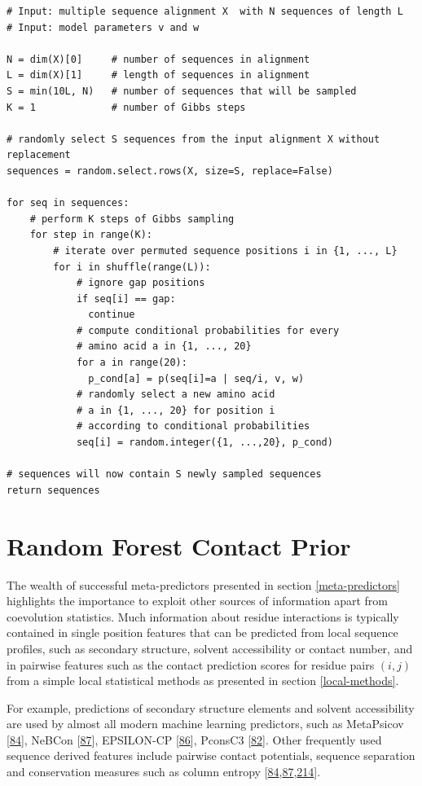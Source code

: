 \documentclass[11pt,a4paper,twoside]{book}
\theoremstyle{definition}
\theoremstyle{definition}
\theoremstyle{remark}
\begin{document}
\begin{verbatim}
# Input: multiple sequence alignment X  with N sequences of length L
# Input: model parameters v and w

N = dim(X)[0]     # number of sequences in alignment
L = dim(X)[1]     # length of sequences in alignment
S = min(10L, N)   # number of sequences that will be sampled
K = 1             # number of Gibbs steps

# randomly select S sequences from the input alignment X without replacement
sequences = random.select.rows(X, size=S, replace=False)

for seq in sequences:
    # perform K steps of Gibbs sampling
    for step in range(K):
        # iterate over permuted sequence positions i in {1, ..., L}
        for i in shuffle(range(L)):
            # ignore gap positions
            if seq[i] == gap:
              continue
            # compute conditional probabilities for every 
            # amino acid a in {1, ..., 20}
            for a in range(20):
              p_cond[a] = p(seq[i]=a | seq/i, v, w)
            # randomly select a new amino acid 
            # a in {1, ..., 20} for position i 
            # according to conditional probabilities
            seq[i] = random.integer({1, ...,20}, p_cond)

# sequences will now contain S newly sampled sequences
return sequences
\end{verbatim}

\chapter{Random Forest Contact Prior}\label{contact-prior}

The wealth of successful meta-predictors presented in section
\ref{meta-predictors} highlights the importance to exploit other sources
of information apart from coevolution statistics. Much information about
residue interactions is typically contained in single position features
that can be predicted from local sequence profiles, such as secondary
structure, solvent accessibility or contact number, and in pairwise
features such as the contact prediction scores for residue pairs
\((i,j)\) from a simple local statistical methods as presented in
section \ref{local-methods}.

For example, predictions of secondary structure elements and solvent
accessibility are used by almost all modern machine learning predictors,
such as MetaPsicov {[}\protect\hyperlink{ref-Jones2015a}{84}{]}, NeBCon
{[}\protect\hyperlink{ref-He2017}{87}{]}, EPSILON-CP
{[}\protect\hyperlink{ref-Stahl2017}{86}{]}, PconsC3
{[}\protect\hyperlink{ref-Skwark2016}{82}{]}. Other frequently used
sequence derived features include pairwise contact potentials, sequence
separation and conservation measures such as column entropy
{[}\protect\hyperlink{ref-Jones2015a}{84},\protect\hyperlink{ref-He2017}{87},\protect\hyperlink{ref-Ma2015a}{214}{]}.
\end{document}
